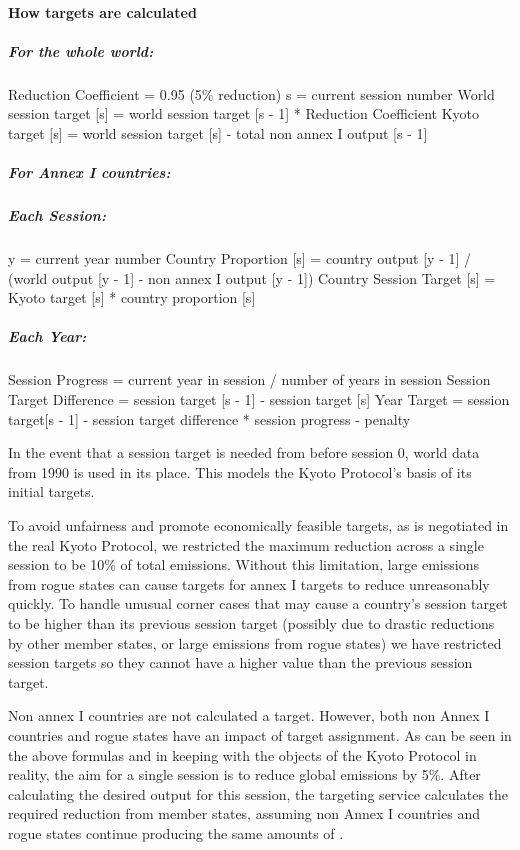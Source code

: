 \paragraph{How targets are calculated}
\subparagraph{For the whole world:}
Reduction Coefficient = 0.95 (5\% reduction)
s = current session number
World session target [s] = world session target [s - 1] * Reduction Coefficient
Kyoto target [s] = world session target [s] - total non annex I output [s - 1]

\subparagraph{For Annex I countries:}
\subparagraph{Each Session:}
y = current year number
Country Proportion [s] = country output [y - 1] / (world output [y - 1] - non annex I output [y - 1])
Country Session Target [s] = Kyoto target [s] * country proportion [s]
 
\subparagraph{Each Year:}
Session Progress = current year in session / number of years in session
Session Target Difference = session target [s - 1] - session target [s]
Year Target = session target[s - 1] - session target difference * session progress - penalty

In the event that a session target is needed from before session 0, world data from 1990 is used in its place. This models the Kyoto Protocol's basis of its initial targets.
 
To avoid unfairness and promote economically feasible targets, as is negotiated in the real Kyoto Protocol, we restricted the maximum reduction across a single session to be 10\% of total emissions. Without this limitation, large emissions from rogue states can cause targets for annex I targets to reduce unreasonably quickly. To handle unusual corner cases that may cause a country's session target to be higher than its previous session target (possibly due to drastic reductions by other member states, or large emissions from rogue states) we have restricted session targets so they cannot have a higher value than the previous session target.
 
Non annex I countries are not calculated a target. However, both non Annex I countries and rogue states have an impact of target assignment. As can be seen in the above formulas and in keeping with the objects of the Kyoto Protocol in reality, the aim for a single session is to reduce global \CO emissions by 5\%. After calculating the desired output for this session, the targeting service calculates the required reduction from member states, assuming non Annex I countries and rogue states continue producing the same amounts of \CO.

